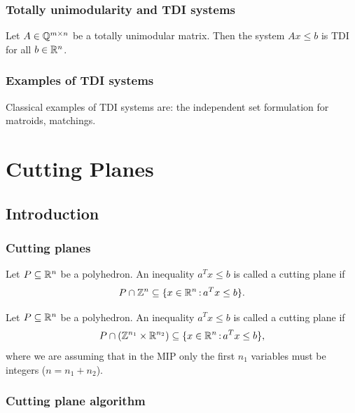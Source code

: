 \documentclass[../open-optimization/open-optimization.tex]{subfiles}
\begin{document}
\subsection{Totally unimodularity and TDI systems}

\begin{theorem}
Let $A\in{\mathbb{Q}}^{m\times n}$ be a totally unimodular matrix. Then the system $Ax\leq b$ is TDI for all $b\in{\mathbb{R}}^{n}$.
\end{theorem}

\subsection{Examples of TDI systems}

Classical examples of TDI systems are: the independent set formulation for matroids, matchings.



\chapter{Cutting Planes}
\section{Introduction}

\subsection{Cutting planes}
 
\begin{definition} Let $P\subseteq{\mathbb{R}}^n$ be a polyhedron. An inequality $a^Tx\leq b$ is called a cutting plane if 
$$P\cap{\mathbb{Z}}^n\subseteq \{x\in{\mathbb{R}}^n{\,:\,} a^Tx\leq b\}.$$
\end{definition}

\begin{definition} Let $P\subseteq{\mathbb{R}}^n$ be a polyhedron. An inequality $a^Tx\leq b$ is called a cutting plane if 
$$P\cap({\mathbb{Z}}^{n_1}\times{\mathbb{R}}^{n_2} ) \subseteq \{x\in{\mathbb{R}}^n{\,:\,} a^Tx\leq b\},$$
where we are assuming that in the MIP only the first $n_1$ variables must be integers ($n=n_1+n_2$).
\end{definition}

\subsection{Cutting plane algorithm}
\end{document}

